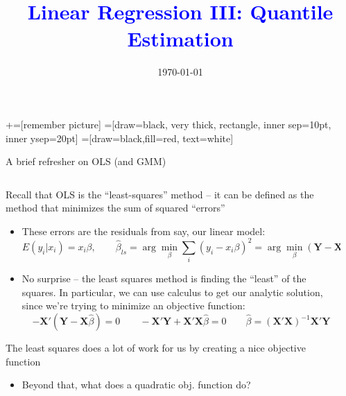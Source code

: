 \documentclass[notes,11pt, aspectratio=169]{beamer}
\title[]{\textcolor{blue}{Linear Regression III: Quantile Estimation}}
\author[PGP]{}
\institute[FRBNY]{\small{Paul Goldsmith-Pinkham}}
\date{\today}
\newenvironment{wideitemize}{\itemize\addtolength{\itemsep}{10pt}}{\enditemize}
\begin{document}
\newcommand\marktopleft[1]{%
    \tikz[overlay,remember picture] 
        \node (marker-#1-a) at (-.3em,.3em) {};%
}
\newcommand\markbottomright[2]{%
    \tikz[overlay,remember picture] 
        \node (marker-#1-b) at (0em,0em) {};%
}
+=[remember picture] 
 =[draw=black, very thick, rectangle, inner sep=10pt, inner ysep=20pt]
 =[draw=black,fill=red, text=white]

\begin{frame}
\maketitle

\end{frame}


\begin{frame}{A brief refresher on OLS (and GMM)}
  \begin{columns}[T] %
\begin{column}{.8\textwidth}
  \begin{wideitemize}
  \item Recall that OLS is the ``least-squares'' method -- it can be
    defined as the method that minimizes the sum of squared ``errors''
    \begin{itemize}
    \item These errors are the residuals from say, our linear model:
      $$E(y_{i}|x_{i}) = x_{i}\beta, \qquad \hat{\beta}_{ls} = \arg\min_{\beta} \sum_{i} (y_{i} - x_{i}\beta)^{2} = \arg\min_{\beta} (\mathbf{Y} - \mathbf{X}\beta)'(\mathbf{Y} - \mathbf{X}\beta) $$
    \item No surprise -- the least squares method is finding the ``least'' of the squares. In particular, we can use calculus to get our analytic solution, since we're trying to minimize an objective function:
$$ -\mathbf{X}'(\mathbf{Y} - \mathbf{X}\hat{\beta})  = 0 \qquad  -\mathbf{X}'\mathbf{Y}  + \mathbf{X}'\mathbf{X}\hat{\beta}  = 0 \qquad  \hat{\beta}  = (\mathbf{X}'\mathbf{X})^{-1}\mathbf{X}'\mathbf{Y} $$
\end{itemize}
\item The least squares does a lot of work for us by creating a nice
  objective function
  \begin{itemize}
  \item Beyond that, what does a quadratic obj. function do?
  \end{itemize}
  \end{wideitemize}
  \end{column}%
  \hfill%
  \begin{column}{.5\textwidth}
  \end{column}
\end{columns}
\end{frame}
\end{document}
